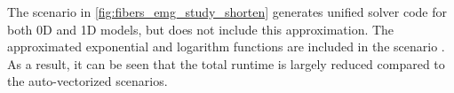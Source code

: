 The scenario  in \cref{fig:fibers_emg_study_shorten} generates unified solver code for both 0D and 1D models, but does not include this approximation. The approximated exponential and logarithm functions are included in the scenario . As a result, it can be seen that the total runtime is largely reduced compared to the auto-vectorized scenarios.







